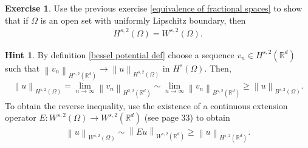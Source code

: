 \documentclass[
    a4paper,
    DIV=14,
    abstract=true,
    numbers=noenddot
]
{scrartcl}
\theoremstyle{definition}
\newtheorem{exercise}{Exercise}
\newtheorem*{hint}{Hint}
\renewcommand{\norm}[1]{\left\lVert #1 \right\rVert}\renewcommand{\abs}[1]{\left| #1 \right|}
\newcommand{\R}{\mathbb{R}}
\begin{document}
\begin{exercise}
    Use the previous exercise \ref{equivalence of fractional spaces} to show that if $\Omega $ is an open set with uniformly Lipschitz boundary, then
    \begin{align*}
        H^{s,2}(\Omega )=W^{s,2}(\Omega ).
    \end{align*}
\end{exercise}
\begin{hint}
    By definition \ref{bessel potential def} choose a sequence $v_n \in H^{s,2}(\R^d)$ such that $\norm{v_n}_{H^{s,2}(\R^d)} \to \norm{u}_{H^{s,2}(\Omega )}$ in $H^s(\Omega )$. Then,
    \begin{align*}
        \norm{u}_{H^{s,2}(\Omega)}= \lim_{n\to\infty}\norm{v_n}_{H^{2,2}(\R^d)}\sim \lim_{n\to\infty}\norm{v_n}_{B^{s,2}(\R^d)}\geq \norm{u}_{B^{s,2}(\Omega )}.
    \end{align*}
    To obtain the reverse inequality, use the existence of a continuous extension operator $E: W^{s,2}(\Omega )\to W^{s,2}(\R^d)$ (see \cite{di2012hitchhiker's} page 33) to obtain
    \begin{align*}
        \norm{u}_{W^{s,2}(\Omega )}\sim \norm{Eu}_{W^{s,2}(\R^d)}\geq \norm{u}_{H^{s,2}(\R^d)}.
    \end{align*}

\end{hint}
\end{document}
